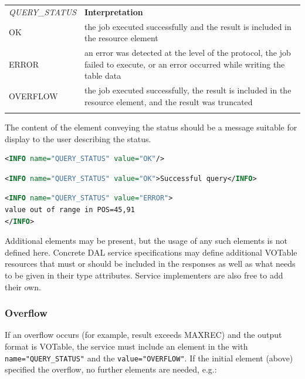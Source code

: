 \documentclass[11pt,letter]{ivoa}
\begin{document}
\begin{tabular}{l p{8cm}}
\sptablerule
\emph{QUERY\_STATUS}&\textbf{Interpretation}\\
\sptablerule
OK & the job executed successfully and the result is included in the
resource element\\
ERROR & an error was detected at the level of the protocol, the job failed to
execute, or an error occurred while writing the table data \\
OVERFLOW & the job executed successfully, the result is included in the
resource element, and the result was truncated \\
\sptablerule
\label{tab:query-status}
\end{tabular}

The content of the  element conveying the status should be a message
suitable for display to the user describing the status.

\begin{lstlisting}[language=XML]
<INFO name="QUERY_STATUS" value="OK"/>
\end{lstlisting}

\begin{lstlisting}[language=XML]
<INFO name="QUERY_STATUS" value="OK">Successful query</INFO>
\end{lstlisting}

\begin{lstlisting}[language=XML]
<INFO name="QUERY_STATUS" value="ERROR">
value out of range in POS=45,91
</INFO>
\end{lstlisting}

Additional  elements may be present, but the usage of any such elements
is not defined here. Concrete DAL service specifications may define additional
VOTable resources that must or should be included in the responses as
well as what needs to be given in their type attributes.
Service implementers are also free to add their own.

\subsubsection{Overflow}
\label{sec:response-overflow}
If an overflow occurs (for example, result exceeds MAXREC) and the output format
is VOTable, the service must include an  element in the 
with \verb|name="QUERY_STATUS"| and the \verb|value="OVERFLOW"|. If the initial
 element (above) specified the overflow, no further elements are needed,
e.g.:
\end{document}
